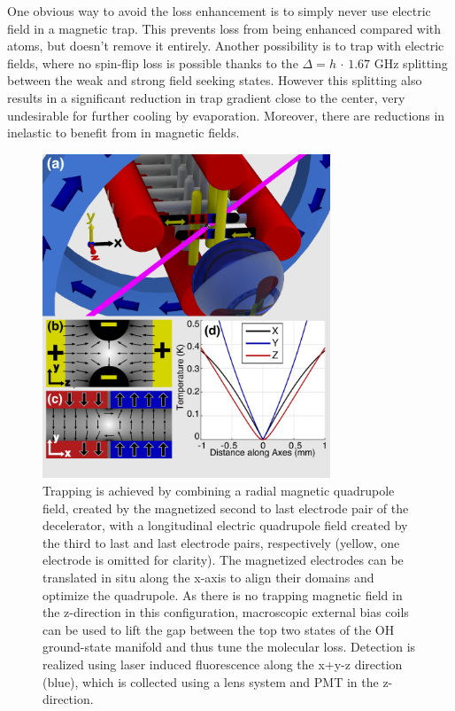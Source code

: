 \documentclass[%
 reprint,
 amsmath,amssymb,
 aps,
prl,
]{revtex4-1}
\begin{document}


One obvious way to avoid the loss enhancement is to simply never use electric field in a magnetic trap. This prevents loss from being enhanced compared with atoms, but doesn't remove it entirely. Another possibility is to trap with electric fields, where no spin-flip loss is possible thanks to the $\Delta=h\,\cdot\,1.67\text{ GHz}$ splitting between the weak and strong field seeking states. However this splitting also results in a significant reduction in trap gradient close to the center, very undesirable for further cooling by evaporation. Moreover, there are reductions in inelastic to benefit from in magnetic fields. \cite{stuhl2012evap}

\begin{figure}
\includegraphics[width=86mm]{CAD_recolor_laser_panels.PNG}%
\caption{
Trapping is achieved by combining a radial magnetic quadrupole field, created by the magnetized second to last electrode pair of the decelerator, with a longitudinal electric quadrupole field created by the third to last and last electrode pairs, respectively (yellow, one electrode is omitted for clarity). The magnetized electrodes can be translated in situ along the x-axis to align their domains and optimize the quadrupole. As there is no trapping magnetic field in the z-direction in this configuration, macroscopic external bias coils can be used to lift the gap between the top two states of the OH ground-state manifold and thus tune the molecular loss. Detection is realized using laser induced fluorescence along the x+y-z direction (blue), which is collected using a lens system and PMT in the z-direction.
\label{fig:CAD}}
\end{figure}
\end{document}
